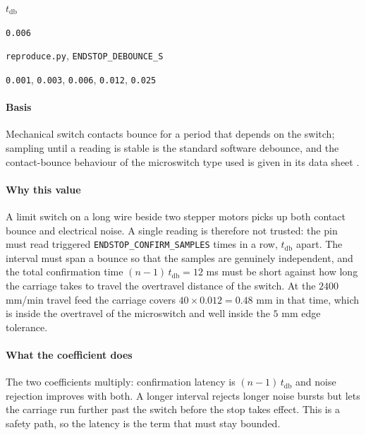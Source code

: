 \label{coef:endstop-debounce}

\begin{description}[leftmargin=5.2em,style=sameline]

\item[Symbol] $t_{\text{db}}$

\item[Value] \texttt{0.006}

\item[Source] \texttt{reproduce.py}, \texttt{ENDSTOP\_DEBOUNCE\_S}

\item[Swept] \texttt{0.001}, \texttt{0.003}, \texttt{0.006}, \texttt{0.012}, \texttt{0.025}

\end{description}

\paragraph{Basis}

Mechanical switch contacts bounce for a period that depends on the switch; sampling until a reading is stable is the standard software debounce, and the contact-bounce behaviour of the microswitch type used is given in its data sheet \cite{stepperds}.

\paragraph{Why this value}

A limit switch on a long wire beside two stepper motors picks up both contact bounce and electrical noise. A single reading is therefore not trusted: the pin must read triggered \texttt{ENDSTOP\_CONFIRM\_SAMPLES} times in a row, $t_{\text{db}}$ apart. The interval must span a bounce so that the samples are genuinely independent, and the total confirmation time $(n-1)\,t_{\text{db}} = 12$ ms must be short against how long the carriage takes to travel the overtravel distance of the switch. At the $2400$ mm/min travel feed the carriage covers $40 \times 0.012 = 0.48$ mm in that time, which is inside the overtravel of the microswitch and well inside the $5$ mm edge tolerance.

\paragraph{What the coefficient does}

The two coefficients multiply: confirmation latency is $(n-1)\,t_{\text{db}}$ and noise rejection improves with both. A longer interval rejects longer noise bursts but lets the carriage run further past the switch before the stop takes effect. This is a safety path, so the latency is the term that must stay bounded.

